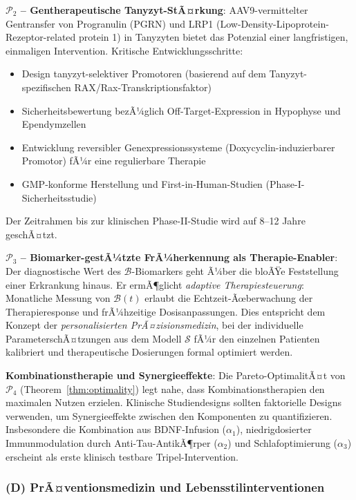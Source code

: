 ﻿\documentclass[12pt,a4paper]{article}
\theoremstyle{definition}
\begin{document}
	\textbf{$\mathcal{P}_2$ -- Gentherapeutische Tanyzyt-StÃ¤rkung}: AAV9-vermittelter Gentransfer von Progranulin (PGRN) und LRP1 (Low-Density-Lipoprotein-Rezeptor-related protein 1) in Tanyzyten bietet das Potenzial einer langfristigen, einmaligen Intervention. Kritische Entwicklungsschritte:
	\begin{itemize}
		\item Design tanyzyt-selektiver Promotoren (basierend auf dem Tanyzyt-spezifischen RAX/Rax-Transkriptionsfaktor)
		\item Sicherheitsbewertung bezÃ¼glich Off-Target-Expression in Hypophyse und Ependymzellen
		\item Entwicklung reversibler Genexpressionssysteme (Doxycyclin-induzierbarer Promotor) fÃ¼r eine regulierbare Therapie
		\item GMP-konforme Herstellung und First-in-Human-Studien (Phase-I-Sicherheitsstudie)
	\end{itemize}
	Der Zeitrahmen bis zur klinischen Phase-II-Studie wird auf 8--12 Jahre geschÃ¤tzt.

	\textbf{$\mathcal{P}_3$ -- Biomarker-gestÃ¼tzte FrÃ¼herkennung als Therapie-Enabler}: Der diagnostische Wert des $\mathcal{B}$-Biomarkers geht Ã¼ber die bloÃŸe Feststellung einer Erkrankung hinaus. Er ermÃ¶glicht \emph{adaptive Therapiesteuerung}: Monatliche Messung von $\mathcal{B}(t)$ erlaubt die Echtzeit-Ãœberwachung der Therapieresponse und frÃ¼hzeitige Dosisanpassungen. Dies entspricht dem Konzept der \emph{personalisierten PrÃ¤zisionsmedizin}, bei der individuelle ParameterschÃ¤tzungen aus dem Modell $\mathcal{S}$ fÃ¼r den einzelnen Patienten kalibriert und therapeutische Dosierungen formal optimiert werden.

	\textbf{Kombinationstherapie und Synergieeffekte}: Die Pareto-OptimalitÃ¤t von $\mathcal{P}_4$ (Theorem~\ref{thm:optimality}) legt nahe, dass Kombinationstherapien den maximalen Nutzen erzielen. Klinische Studiendesigns sollten faktorielle Designs verwenden, um Synergieeffekte zwischen den Komponenten zu quantifizieren. Insbesondere die Kombination aus BDNF-Infusion ($\alpha_1$), niedrigdosierter Immunmodulation durch Anti-Tau-AntikÃ¶rper ($\alpha_2$) und Schlafoptimierung ($\alpha_3$) erscheint als erste klinisch testbare Tripel-Intervention.

	\subsubsection*{(D) PrÃ¤ventionsmedizin und Lebensstilinterventionen}
\end{document}
